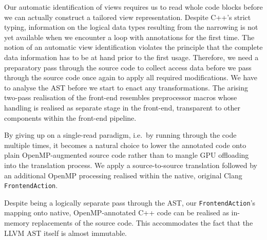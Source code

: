 Our automatic identification of views requires us to read whole code blocks before we can actually construct a tailored view representation.
Despite C++'s strict typing, information on the logical data types resulting from the narrowing is not yet available when we encounter a loop with annotations for the first time.
The notion of an automatic view identification violates the principle that the complete data information has to be at hand prior to the first usage.
Therefore, we need a preparatory pass through the source code to collect access data before we pass through the source code once again to apply all required modifications.
We have to analyse the AST before we start to enact any transformations.
The arising two-pass realisation of the front-end resembles preprocessor macros whose handling is realised as separate stage in the front-end, transparent to other components within the front-end pipeline.


By giving up on a single-read paradigm, i.e.~by running through the code multiple times, it becomes a natural choice to lower the annotated code onto plain OpenMP-augmented source code rather than to mangle GPU offloading into the translation process.
We apply a source-to-source translation followed by an additional OpenMP processing realised within the native, original Clang \texttt{FrontendAction}.


Despite being a logically separate pass through the AST, our \texttt{FrontendAction}'s mapping onto native, OpenMP-annotated C++ code can be realised as in-memory replacements of the source code.
This accommodates the fact that the LLVM AST itself is almost immutable.






